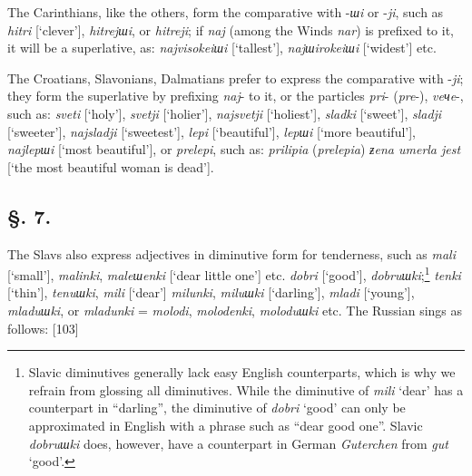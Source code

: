 The Carinthians, like the others, form the comparative with -\textit{шi} or -\textit{ji}, such as \textit{hitri} [‘clever’], \textit{hitrejшi}, or \textit{hitreji}; if \textit{naj} (among the Winds \textit{nar}) is prefixed to it, it will be a superlative, as: \textit{najvisokeiшi} [‘tallest’], \textit{najшirokeiшi} [‘widest’] etc.

The Croatians, Slavonians, Dalmatians prefer to express the comparative with -\textit{ji}; they form the superlative by prefixing \textit{naj}- to it, or the particles \textit{pri}- (\textit{pre}-), \textit{veчe}-, such as: \textit{sveti} [‘holy’], \textit{svetji} [‘holier’], \textit{najsvetji} [‘holiest’], \textit{sladki} [‘sweet’], \textit{sladji} [‘sweeter’], \textit{najsladji} [‘sweetest’], \textit{lepi} [‘beautiful’], \textit{lepшi} [‘more beautiful’], \textit{najlepшi} [‘most beautiful’], or \textit{prelepi}, such as: \textit{prilipia} (\textit{prelepia}) \textit{ƶena umerla jest} [‘the most beautiful woman is dead’].

\subsection*{\hspace*{\fill}§. 7.\hspace*{\fill}}

The Slavs also express adjectives in diminutive form for tenderness, such as \linebreak{}\textit{mali} [‘small’], \textit{malinki}, \textit{maleшenki} [‘dear little one’] etc. \textit{dobri} [‘good’], \linebreak{}\textit{dobruшki};\footnote{Slavic diminutives generally lack easy English counterparts, which is why we refrain from glossing all diminutives. While the diminutive of \textit{mili} ‘dear’ has a counterpart in “darling”, the diminutive of \textit{dobri} ‘good’ can only be approximated in English with a phrase such as “dear good one”. Slavic \textit{dobruшki} does, however, have a counterpart in German \textit{Guterchen} from \textit{gut} ‘good’.} \textit{tenki} [‘thin’], \textit{tenuшki}, \textit{mili} [‘dear’] \textit{milunki}, \textit{miluшki} [‘darling’], \linebreak{}\textit{mladi} [‘young’], \textit{mladuшki}, or \textit{mladunki} = \textit{molodi}, \textit{molodenki}, \textit{moloduшki} etc. The Russian sings as follows: [103]

